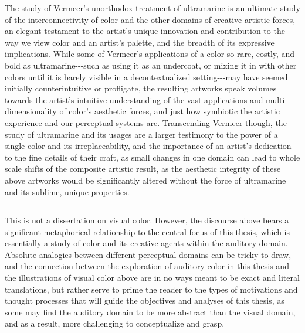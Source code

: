 The study of Vermeer's unorthodox treatment of ultramarine is an
ultimate study of the interconnectivity of color and the other domains
of creative artistic forces, an elegant testament to the artist's unique
innovation and contribution to the way we view color and an artist's
palette, and the breadth of its expressive implications. While some of
Vermeer's applications of a color so rare, costly, and bold as
ultramarine-\/-\/-such as using it as an undercoat, or mixing it in with
other colors until it is barely visible in a decontextualized
setting-\/-\/-may have seemed initially counterintuitive or profligate,
the resulting artworks speak volumes towards the artist's intuitive
understanding of the vast applications and multi-dimensionality of
color's aesthetic forces, and just how symbiotic the artistic experience
and our perceptual systems are. Transcending Vermeer though, the study
of ultramarine and its usages are a larger testimony to the power of a
single color and its irreplaceability, and the importance of an artist's
dedication to the fine details of their craft, as small changes in one
domain can lead to whole scale shifts of the composite artistic result,
as the aesthetic integrity of these above artworks would be
significantly altered without the force of ultramarine and its sublime,
unique properties.
\iftoggle{pretty}{}{\vspace{\baselineskip}}
\par\noindent\hfil\rule{0.5\textwidth}{.4pt}\hfil\par
\iftoggle{pretty}{}{\vspace{\baselineskip}}
    This is not a dissertation on visual color. However, the discourse above
bears a significant metaphorical relationship to the central focus of
this thesis, which is essentially a study of color and its creative
agents within the auditory domain. Absolute analogies between different
perceptual domains can be tricky to draw, and the connection between the
exploration of auditory color in this thesis and the illustrations of
visual color above are in no ways meant to be exact and literal
translations, but rather serve to prime the reader to the types of
motivations and thought processes that will guide the objectives and
analyses of this thesis, as some may find the auditory domain to be more
abstract than the visual domain, and as a result, more challenging to
conceptualize and grasp.

